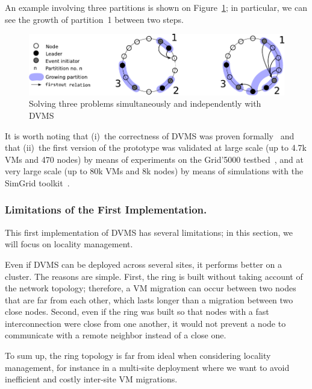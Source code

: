 An example involving three partitions is shown on Figure~\ref{fig:isp}; in
particular, we can see the growth of partition~1 between two steps.
\begin{figure}[h!]
  \centering
  \includegraphics[width=0.9\linewidth]{Figures/resourceAcquisition-standard.pdf}
  \caption{Solving three problems simultaneously and independently with DVMS}%
  \label{fig:isp}%
\end{figure}

It is worth noting that (i)~the correctness of DVMS was proven
formally~\cite{quesnel:ispa13} and that (ii)~the first version of the prototype
was validated at large scale (up to 4.7k VMs and 470 nodes) by means of experiments on the Grid'5000
testbed~\cite{quesnel:ispa13},
and at very large scale (up to 80k VMs and 8k nodes) by means of simulations
with the SimGrid toolkit~\cite{Casanova:2008:SGF:1397760.1398183}.

\subsubsection{Limitations of the First Implementation.}

This first implementation of DVMS has several limitations; in this section, we
will focus on locality management.

Even if DVMS can be deployed across several sites, it performs better on a
cluster.
%
The reasons are simple.
%
First, the ring is built without taking account of the network topology;
therefore, a VM migration can occur between two nodes that are far from each
other, which lasts longer than a migration between two close nodes.
%
Second, even if the ring was built so that nodes with a fast interconnection
were close from one another, it would not prevent a node to communicate with 
a remote neighbor instead of a close one.

To sum up, the ring topology is far from ideal when considering locality
management, for instance in a multi-site deployment where we want to avoid
inefficient and costly inter-site VM migrations.




